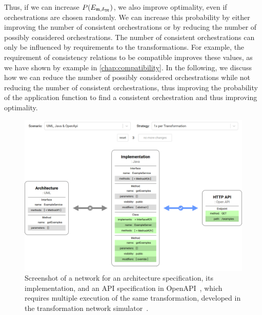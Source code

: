 Thus, if we can increase $P(E_{\modeltuple{m},\changetuple{\metamodeltuple{M}}})$, we also improve optimality, even if orchestrations are chosen randomly.
We can increase this probability by either improving the number of consistent orchestrations or by reducing the number of possibly considered orchestrations.
The number of consistent orchestrations can only be influenced by requirements to the transformations.
For example, the requirement of consistency relations to be compatible improves these values, as we have shown by example in \autoref{chap:compatibility}.
In the following, we discuss how we can reduce the number of possibly considered orchestrations while not reducing the number of consistent orchestrations, thus improving the probability of the application function to find a consistent orchestration and thus improving optimality.

\begin{figure}
    \centering
    \includegraphics[width=\textwidth]{figures/correctness/orchestration/simulator_screenshot.png}
    \caption[Screenshot of the transformation network simulator]{Screenshot of a network for an architecture specification, its implementation, and an \gls{API} specification in OpenAPI~\cite{OpenAPI}, which requires multiple execution of the same transformation, developed in the transformation network simulator~.}
    \label{fig:orchestration:simulator}
\end{figure}

